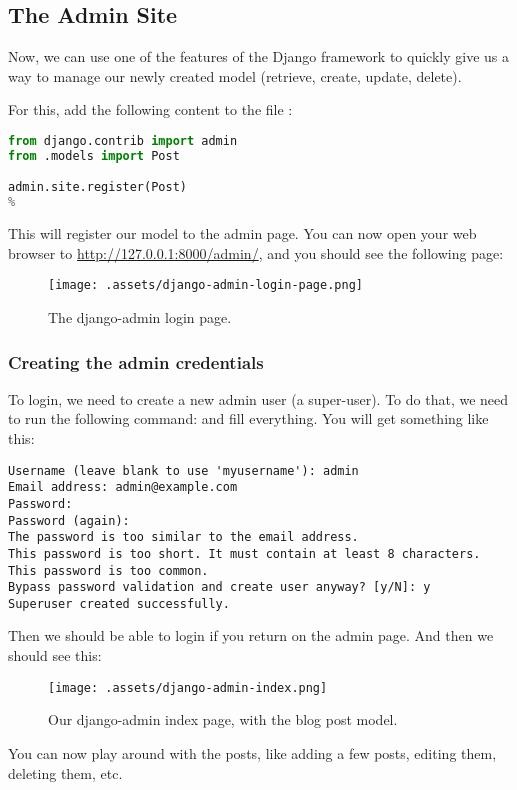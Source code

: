 \subsection{The Admin Site}
    Now, we can use one of the features of the Django framework to quickly give us a way
    to manage our newly created model (retrieve, create, update, delete).
    
    For this, add the following content to the file :
    
    \begin{lstlisting}[language=python]
from django.contrib import admin
from .models import Post

admin.site.register(Post)
%
    \end{lstlisting}
    
    This will register our  model to the admin page. You can now open your
    web browser to \url{http://127.0.0.1:8000/admin/}, and you should see the following page:
    
    \begin{figure}[H]
        \centering
        \texttt{[image: .assets/django-admin-login-page.png]}
        \caption{The django-admin login page.}
    \end{figure}
    
    \subsubsection{Creating the admin credentials}
        To login, we need to create a new admin user (a super-user). To do that, 
        we need to run the following command: 
        and fill everything. You will get something like this:
        
        \begin{lstlisting}[numbers=none]
Username (leave blank to use 'myusername'): admin
Email address: admin@example.com
Password:
Password (again):
The password is too similar to the email address.
This password is too short. It must contain at least 8 characters.
This password is too common.
Bypass password validation and create user anyway? [y/N]: y
Superuser created successfully.
        \end{lstlisting}
        
        Then we should be able to login if you return on the admin page. And then we should see this:
        
        \begin{figure}[H]
            \centering
            \texttt{[image: .assets/django-admin-index.png]}
            \caption{Our django-admin index page, with the blog post model.}
        \end{figure}
        
        You can now play around with the posts, like adding a few posts, editing them, deleting them, etc.
